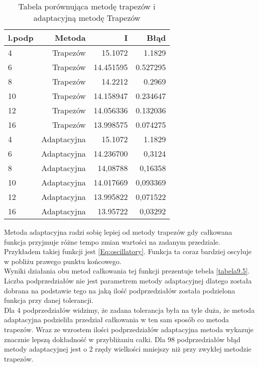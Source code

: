\documentclass[12pt,twoside]{article}
\begin{document}
\begin{table}[H]
\centering 
\caption{Tabela porównująca metodę trapezów i adaptacyjną metodę Trapezów}
\label{tabela9.4}
\begin{tabular}{lrrr}
\toprule
{l.podp} & Metoda &  I &  Błąd \\
\midrule
4  &     Trapezów & 15.1072  &   1.1829 \\
6  &     Trapezów & 14.451595 &   0.527295 \\
8  &     Trapezów & 14.2212   &   0.2969  \\
10  &    Trapezów & 14.158947  &   0.234647  \\
12  &    Trapezów & 14.056336 &    0.132036  \\
16 &     Trapezów & 13.998575  &   0.074275  \\
\midrule
4  &     Adaptacyjna & 15.1072 &   1.1829 \\
6  &     Adaptacyjna & 14.236700 &   0,3124 \\
8  &     Adaptacyjna & 14,08788  &   0,16358  \\
10  &     Adaptacyjna & 14.017669 &  0,093369  \\
12  &    Adaptacyjna & 13.995822 &   0,071522  \\
16 &     Adaptacyjna & 13.95722 &    0,03292  \\

\bottomrule
\end{tabular}
\end{table}

Metoda adaptacyjna radzi sobię lepiej od metody trapezów gdy całkowana funkcja przyjmuje różne tempo zmian wartości na zadanym przedziale. Przykładem takiej funkcji jest \eqref{Eq:oscillatory}. Funkcja ta coraz bardziej oscyluje w pobliżu prawego punktu końcowego.\\
Wyniki działania obu metod całkowania tej funkcji prezentuje tebela \eqref{tabela9.5}.\\
Liczba podprzedziałów nie jest parametrem metody adaptacyjnej dlatego została dobrana na podstawie tego na jaką ilość podprzedziałów została podzielona funkcja przy danej tolerancji.\\
Dla 4 podprzedziałów widzimy, że zadana tolerancja była na tyle duża, że metoda adaptacyjna podzieliła przedział całkowania w ten sam sposób co metoda trapezów.
Wraz ze wzrostem ilości podprzedziałów adaptacyjna metoda wykazuje znacznie lepszą dokładność w przybliżaniu całki. Dla 98 podprzedziałów błąd metody adaptacyjnej jest o 2 rzędy wielkości mniejszy niż przy zwykłej metodzie trapezów.
\end{document}
